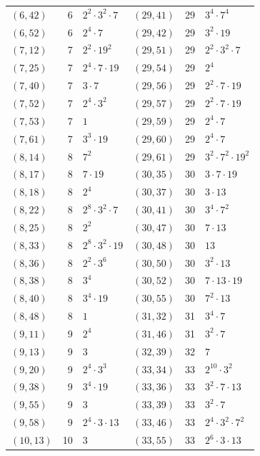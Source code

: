 \documentclass[11pt]{article}
\begin{document}
\begin{longtable}{@{}lrl@{\qquad}lrl@{}}
$(6,42)$ & 6 & $2^{2}\cdot 3^{2}\cdot 7$ & $(29,41)$ & 29 & $3^{4}\cdot 7^{4}$\\
$(6,52)$ & 6 & $2^{4}\cdot 7$ & $(29,42)$ & 29 & $3^{2}\cdot 19$\\
$(7,12)$ & 7 & $2^{2}\cdot 19^{2}$ & $(29,51)$ & 29 & $2^{2}\cdot 3^{2}\cdot 7$\\
$(7,25)$ & 7 & $2^{4}\cdot 7\cdot 19$ & $(29,54)$ & 29 & $2^{4}$\\
$(7,40)$ & 7 & $3\cdot 7$ & $(29,56)$ & 29 & $2^{2}\cdot 7\cdot 19$\\
$(7,52)$ & 7 & $2^{4}\cdot 3^{2}$ & $(29,57)$ & 29 & $2^{2}\cdot 7\cdot 19$\\
$(7,53)$ & 7 & $1$ & $(29,59)$ & 29 & $2^{4}\cdot 7$\\
$(7,61)$ & 7 & $3^{3}\cdot 19$ & $(29,60)$ & 29 & $2^{4}\cdot 7$\\
$(8,14)$ & 8 & $7^{2}$ & $(29,61)$ & 29 & $3^{2}\cdot 7^{2}\cdot 19^{2}$\\
$(8,17)$ & 8 & $7\cdot 19$ & $(30,35)$ & 30 & $3\cdot 7\cdot 19$\\
$(8,18)$ & 8 & $2^{4}$ & $(30,37)$ & 30 & $3\cdot 13$\\
$(8,22)$ & 8 & $2^{8}\cdot 3^{2}\cdot 7$ & $(30,41)$ & 30 & $3^{4}\cdot 7^{2}$\\
$(8,25)$ & 8 & $2^{2}$ & $(30,47)$ & 30 & $7\cdot 13$\\
$(8,33)$ & 8 & $2^{8}\cdot 3^{2}\cdot 19$ & $(30,48)$ & 30 & $13$\\
$(8,36)$ & 8 & $2^{2}\cdot 3^{6}$ & $(30,50)$ & 30 & $3^{2}\cdot 13$\\
$(8,38)$ & 8 & $3^{4}$ & $(30,52)$ & 30 & $7\cdot 13\cdot 19$\\
$(8,40)$ & 8 & $3^{4}\cdot 19$ & $(30,55)$ & 30 & $7^{2}\cdot 13$\\
$(8,48)$ & 8 & $1$ & $(31,32)$ & 31 & $3^{4}\cdot 7$\\
$(9,11)$ & 9 & $2^{4}$ & $(31,46)$ & 31 & $3^{2}\cdot 7$\\
$(9,13)$ & 9 & $3$ & $(32,39)$ & 32 & $7$\\
$(9,20)$ & 9 & $2^{4}\cdot 3^{3}$ & $(33,34)$ & 33 & $2^{10}\cdot 3^{2}$\\
$(9,38)$ & 9 & $3^{4}\cdot 19$ & $(33,36)$ & 33 & $3^{2}\cdot 7\cdot 13$\\
$(9,55)$ & 9 & $3$ & $(33,39)$ & 33 & $3^{2}\cdot 7$\\
$(9,58)$ & 9 & $2^{4}\cdot 3\cdot 13$ & $(33,46)$ & 33 & $2^{4}\cdot 3^{2}\cdot 7^{2}$\\
$(10,13)$ & 10 & $3$ & $(33,55)$ & 33 & $2^{6}\cdot 3\cdot 13$\\

\end{longtable}
\end{document}
